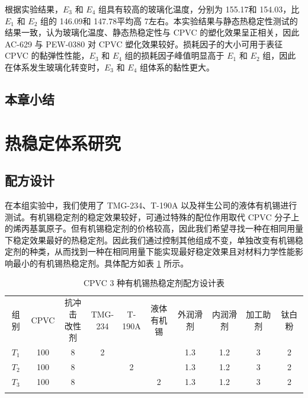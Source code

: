 根据实验结果，$E_3$ 和 $E_4$ 组具有较高的玻璃化温度，分别为 155.17\cd 和 154.03\cd，比 $E_1$ 和 $E_2$ 组的 146.09\cd 和 147.78\cd 平均高 7\cd 左右。本实验结果与静态热稳定性测试的结果一致，认为玻璃化温度、静态热稳定性与 CPVC 的塑化效果呈正相关，因此 AC-629 与 PEW-0380 对 CPVC 塑化效果较好。损耗因子的大小可用于表征 CPVC 的黏弹性性能，$E_3$ 和 $E_4$ 组的损耗因子峰值明显高于 $E_1$ 和 $E_2$ 组，因此在体系发生玻璃化转变时，$E_3$ 和 $E_4$ 组体系的黏性更大。

\subsection{本章小结}


\section{热稳定体系研究}

\subsection{配方设计}
在本组实验中，我们使用了 TMG-234、T-190A 以及祥生公司的液体有机锡进行测试。有机锡稳定剂的稳定效果较好，可通过特殊的配位作用取代 CPVC 分子上的烯丙基氯原子。但有机锡稳定剂的价格较高，因此我们希望寻找一种在相同用量下稳定效果最好的热稳定剂。因此我们通过控制其他组成不变，单独改变有机锡稳定剂的种类，从而找到一种在相同用量下能实现最好稳定效果且对材料力学性能影响最小的有机锡热稳定剂。具体配方如表 \ref{tab3Pre} 所示。

\begin{table}[!htb]
    \caption{CPVC 3 种有机锡热稳定剂配方设计表}
    \label{tab3Pre}
    \begin{center}
    \footnotesize{
        \begin{tabular}{cccccccccc}
            \Xhline{1pt}
			组别 & CPVC & \makecell[c]{抗冲击\\改性剂} & \makecell[c]{TMG-\\234} & \makecell[c]{T-\\190A} & \makecell[c]{液体\\有机锡} & 外润滑剂 & 内润滑剂 & 加工助剂 & 钛白粉	\\
            \Xhline{0.5pt}
            $T_1$ & 100 & 8 & 2 & & & 1.3 & 1.2 & 3 & 2	\\
            $T_2$ & 100 & 8 & & 2 & & 1.3 & 1.2 & 3 & 2	\\
            $T_3$ & 100 & 8 & & & 2 & 1.3 & 1.2 & 3 & 2	\\
            \Xhline{1pt}
        \end{tabular}
    }
    \end{center}
\end{table}

